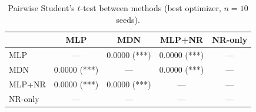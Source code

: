 \begin{table}[H]
\centering
\caption{Pairwise Student's $t$-test between methods (best optimizer, $n=10$ seeds).}
\label{tab:ttest}
\begin{tabular}{lcccc}
\toprule
 & MLP & MDN & MLP+NR & NR-only \\
\midrule
MLP & — & $0.0000$ (***) & $0.0000$ (***) & — \\
MDN & $0.0000$ (***) & — & $0.0000$ (***) & — \\
MLP+NR & $0.0000$ (***) & $0.0000$ (***) & — & — \\
NR-only & — & — & — & — \\
\bottomrule
\end{tabular}
\end{table}